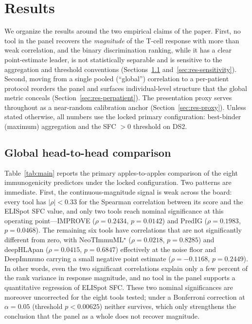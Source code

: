 \section{Results}
\label{sec:results}

We organize the results around the two empirical claims of the paper. First, no
tool in the panel recovers the \emph{magnitude} of the T-cell response with more
than weak correlation, and the binary discrimination ranking, while it has a
clear point-estimate leader, is not statistically separable and is sensitive to
the aggregation and threshold conventions (Sections~\ref{sec:res-global}
and~\ref{sec:res-sensitivity}). Second, moving from a single pooled
(``global'') correlation to a per-patient protocol reorders the panel and
surfaces individual-level structure that the global metric conceals
(Section~\ref{sec:res-perpatient}). The presentation proxy serves throughout as a
near-random calibration anchor (Section~\ref{sec:res-proxy}). Unless stated
otherwise, all numbers use the locked primary configuration: best-binder
(maximum) aggregation and the SFC $>0$ threshold on DS2.

\subsection{Global head-to-head comparison}
\label{sec:res-global}

Table~\ref{tab:main} reports the primary apples-to-apples comparison of the eight
immunogenicity predictors under the locked configuration. Two patterns are
immediate. First, the continuous-magnitude signal is weak across the board: every
tool has $|\rho| < 0.33$ for the Spearman correlation between its score and the
ELISpot SFC value, and only two tools reach nominal significance at this
operating point---IMPROVE ($\rho = 0.2434$, $p = 0.0142$) and PredIG
($\rho = 0.1983$, $p = 0.0468$). The remaining six tools have correlations that
are not significantly different from zero, with NeoTImmuML$^\star$
($\rho = 0.0218$, $p = 0.8285$) and deepHLApan ($\rho = 0.0415$, $p = 0.6847$)
effectively at the noise floor and DeepImmuno carrying a small negative point
estimate ($\rho = -0.1168$, $p = 0.2449$). In other words, even the two
significant correlations explain only a few percent of the rank variance in
response magnitude, and no tool in the panel supports a quantitative regression of
ELISpot SFC. These two nominal significances are moreover uncorrected for the
eight tools tested; under a Bonferroni correction at $\alpha = 0.05$ (threshold
$p < 0.00625$) neither survives, which only strengthens the conclusion that the
panel as a whole does not recover magnitude.

